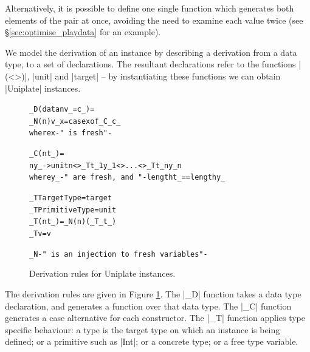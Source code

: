 \documentclass[preprint]{sigplanconf}
\newenvironment{code}{\begin{alltt}\small}{\end{alltt}}
\newcommand{\ignore}{}
\begin{document}
Alternatively, it is possible to define one single function which generates both elements of the pair at once, avoiding the need to examine each value twice (see \S\ref{sec:optimise_playdata} for an example).

We model the derivation of an instance by describing a derivation from a data type, to a set of declarations. The resultant declarations refer to the functions |(<>)|, |unit| and |target| -- by instantiating these functions we can obtain |Uniplate| instances.

\begin{figure}
\ignore\begin{code}
_D (data n v_ = c_) =
        _N(n) v_ x = case  x of _C_ c_
    where x {-" \mbox{ is fresh} "-}

_C (n t_) =
        n y_ -> unit n <> _T t_1 y_1 <> ... <> _T t_n y_n
    where y_ {-" \mbox{ are fresh, and } "-} length t_ == length y_

_T TargetType     = target
_T PrimitiveType  = unit
_T (n t_)         = _N(n) (_T_ t_)
_T v              = v

_N {-" \mbox{ is an injection to fresh variables} "-}
\end{code}
\caption{Derivation rules for Uniplate instances.}
\label{fig:derive}
\end{figure}

The derivation rules are given in Figure \ref{fig:derive}. The |_D| function takes a data type declaration, and generates a function over that data type. The |_C| function generates a case alternative for each constructor. The |_T| function applies type specific behaviour: a type is the target type on which an instance is being defined; or a primitive such as |Int|; or a concrete type; or a free type variable.
\end{document}
